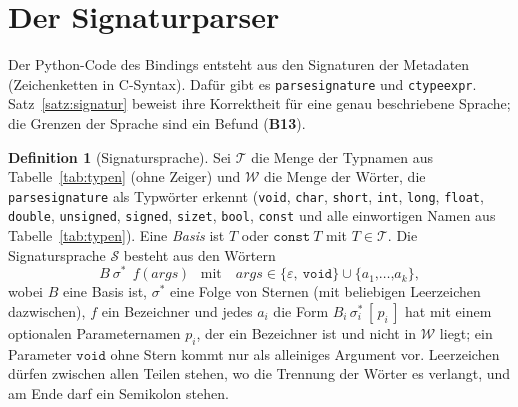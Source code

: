 \documentclass[a4paper,12pt,twoside]{report}
\DeclareRobustCommand{\_}{\ifmmode\mbox{\textunderscore}\else\textunderscore\allowbreak{}\fi}
\theoremstyle{definition}
\newtheorem{definition}{Definition}[chapter]
\newcommand{\Bf}[1]{\textbf{B#1}}
\begin{document}
\section{Der Signaturparser}

Der Python-Code des Bindings entsteht aus den Signaturen der Metadaten (Zeichenketten in C-Syntax). Dafür gibt es \texttt{parse\_signature} und \texttt{ctype\_expr}. Satz~\ref{satz:signatur} beweist ihre Korrektheit für eine genau beschriebene Sprache; die Grenzen der Sprache sind ein Befund (\Bf{13}).

\begin{definition}[Signatursprache]
	\label{def:sig}
	Sei $\mathcal T$ die Menge der Typnamen aus Tabelle~\ref{tab:typen} (ohne Zeiger) und $\mathcal W$ die Menge der Wörter, die \texttt{parse\_signature} als Typwörter erkennt (\texttt{void}, \texttt{char}, \texttt{short}, \texttt{int}, \texttt{long}, \texttt{float}, \texttt{double}, \texttt{unsigned}, \texttt{signed}, \texttt{size\_t}, \texttt{bool}, \texttt{const} und alle einwortigen Namen aus Tabelle~\ref{tab:typen}). Eine \emph{Basis} ist $T$ oder $\texttt{const}\ T$ mit $T\in\mathcal T$. Die Signatursprache $\mathcal S$ besteht aus den Wörtern
	\[
	B\ \sigma^{*}\ \ f\ \texttt{(}\ \mathit{args}\ \texttt{)}\quad\text{mit}\quad\mathit{args}\in\{\varepsilon,\ \texttt{void}\}\cup\{a_1\texttt{,}\ldots\texttt{,}a_k\},
	\]
	wobei $B$ eine Basis ist, $\sigma^*$ eine Folge von Sternen (mit beliebigen Leerzeichen dazwischen), $f$ ein Bezeichner und jedes $a_i$ die Form $B_i\,\sigma_i^*\,[\,p_i\,]$ hat mit einem optionalen Parameternamen $p_i$, der ein Bezeichner ist und nicht in $\mathcal W$ liegt; ein Parameter $\texttt{void}$ ohne Stern kommt nur als alleiniges Argument vor. Leerzeichen dürfen zwischen allen Teilen stehen, wo die Trennung der Wörter es verlangt, und am Ende darf ein Semikolon stehen.
\end{definition}
\end{document}
